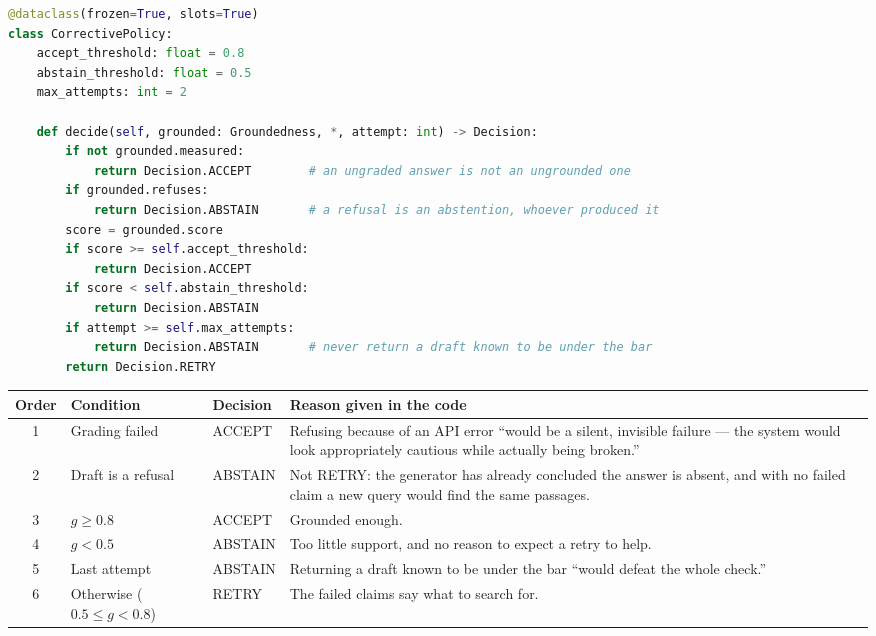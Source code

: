 \begin{lstlisting}[language=Python]
@dataclass(frozen=True, slots=True)
class CorrectivePolicy:
    accept_threshold: float = 0.8
    abstain_threshold: float = 0.5
    max_attempts: int = 2

    def decide(self, grounded: Groundedness, *, attempt: int) -> Decision:
        if not grounded.measured:
            return Decision.ACCEPT        # an ungraded answer is not an ungrounded one
        if grounded.refuses:
            return Decision.ABSTAIN       # a refusal is an abstention, whoever produced it
        score = grounded.score
        if score >= self.accept_threshold:
            return Decision.ACCEPT
        if score < self.abstain_threshold:
            return Decision.ABSTAIN
        if attempt >= self.max_attempts:
            return Decision.ABSTAIN       # never return a draft known to be under the bar
        return Decision.RETRY
\end{lstlisting}

\begin{center}
\begin{tabularx}{\textwidth}{@{}c>{\raggedright\arraybackslash}p{4.3cm}>{\raggedright\arraybackslash}p{1.8cm}L@{}}
\toprule
\textbf{Order} & \textbf{Condition} & \textbf{Decision} & \textbf{Reason given in the code}\\
 & Grading failed & ACCEPT & Refusing because of an API error \enquote{would be a silent, invisible failure --- the system would look appropriately cautious while actually being broken.}\\
2 & Draft is a refusal & ABSTAIN & Not RETRY: the generator has already concluded the answer is absent, and with no failed claim a new query would find the same passages.\\
3 & $g \ge 0.8$ & ACCEPT & Grounded enough.\\
4 & $g < 0.5$ & ABSTAIN & Too little support, and no reason to expect a retry to help.\\
5 & Last attempt & ABSTAIN & Returning a draft known to be under the bar \enquote{would defeat the whole check.}\\
6 & Otherwise ($0.5 \le g < 0.8$) & RETRY & The failed claims say what to search for.\\
\bottomrule
\end{tabularx}
\end{center}

